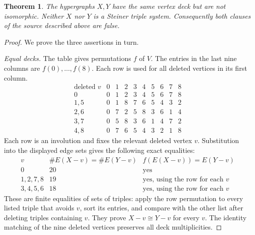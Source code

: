 \documentclass[11pt]{article}
\newtheorem{theorem}{Theorem}
\begin{document}
\begin{theorem}
The hypergraphs $X,Y$ have the same vertex deck but are not isomorphic.
Neither $X$ nor $Y$ is a Steiner triple system. Consequently both clauses
of the source described above are false.
\end{theorem}

\begin{proof}
We prove the three assertions in turn.

\emph{Equal decks.}
The table gives permutations $f$ of $V$. The entries in the last nine
columns are $f(0),\ldots,f(8)$. Each row is used for all deleted vertices
in its first column.
\[
\begin{array}{c|rrrrrrrrr}
\text{deleted }v&0&1&2&3&4&5&6&7&8\\\hline
0   &0&1&2&3&4&5&6&7&8\\
1,5 &0&1&8&7&6&5&4&3&2\\
2,6 &0&7&2&5&8&3&6&1&4\\
3,7 &0&5&8&3&6&1&4&7&2\\
4,8 &0&7&6&5&4&3&2&1&8
\end{array}
\]
Each row is an involution and fixes the relevant deleted vertex $v$.
Substitution into the displayed edge sets gives the following exact
equalities:
\[
\begin{array}{c|c|c}
v&\#E(X-v)=\#E(Y-v)& f(E(X-v))=E(Y-v)\\\hline
0&20&\text{yes}\\
1,2,7,8&19&\text{yes, using the row for each }v\\
3,4,5,6&18&\text{yes, using the row for each }v
\end{array}
\]
These are finite equalities of sets of triples: apply the row permutation
to every listed triple that avoids $v$, sort its entries, and compare
with the other list after deleting triples containing $v$.
They prove $X-v\cong Y-v$ for every $v$. The identity matching of the
nine deleted vertices preserves all deck multiplicities.


\end{proof}
\end{document}
